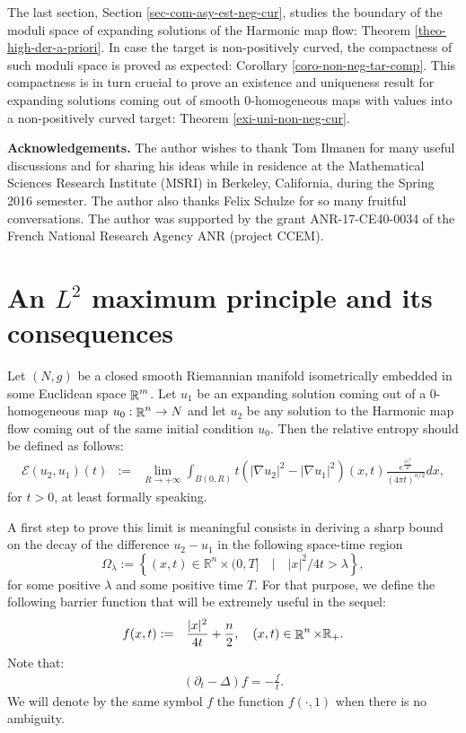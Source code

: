 \documentclass[a4paper,11pt,reqno]{amsart}
\def\R{\mathop{\rm \mathbb{R}}\nolimits}
\begin{document}
The last section, Section \ref{sec-com-asy-est-neg-cur}, studies the boundary of the moduli space of expanding solutions of the Harmonic map flow: Theorem \ref{theo-high-der-a-priori}. In case the target is non-positively curved, the compactness of such moduli space is proved as expected: Corollary \ref{coro-non-neg-tar-comp}. This compactness is in turn crucial to prove an existence and uniqueness result for expanding solutions coming out of smooth $0$-homogeneous maps with values into a non-positively curved target: Theorem \ref{exi-uni-non-neg-cur}. 

\textbf{Acknowledgements.}
The author wishes to thank Tom Ilmanen for many useful discussions and for sharing his ideas while in residence at the Mathematical Sciences Research Institute (MSRI) in Berkeley, California, during the Spring 2016 semester. The author also thanks Felix Schulze for so many fruitful conversations. The author was supported by the grant ANR-17-CE40-0034 of the French National Research Agency ANR (project CCEM).


\section{An $L^2$ maximum principle and its consequences}\label{section-L^2-max-ppe}

Let $(N,g)$ be a closed smooth Riemannian manifold isometrically embedded in some Euclidean space $\R^m$. Let $u_1$ be an expanding solution coming out of a $0$-homogeneous map $u_0:\R^n\rightarrow N$  and let $u_2$ be any solution to the Harmonic map flow coming out of the same initial condition $u_0$. Then the relative entropy should be defined as follows:
\begin{eqnarray}\label{def-rel-entropy}
\mathcal{E}(u_2,u_1)(t)&:=&\lim_{R\rightarrow+\infty}\int_{B(0,R)}t(|\nabla u_2|^2-|\nabla u_1|^2)(x,t)\frac{e^{\frac{|x|^2}{4t}}}{(4\pi t)^{n/2}}dx,%
\end{eqnarray}
for $t>0$,
at least formally speaking.

A first step to prove this limit is meaningful consists in deriving a sharp bound on the decay of the difference $u_2-u_1$ in the following space-time region $$\Omega_{\lambda}:=\left\{(x,t)\in \mathbb{R}^n\times (0,T]\quad|\quad |x|^2/{4t}>\lambda\right\},$$ for some positive $\lambda$ and some positive time $T$. For that purpose, we define the following barrier function that will be extremely useful in the sequel:
\begin{eqnarray*}
f(x,t)&:=&\frac{|x|^2}{4t}+\frac{n}{2},\quad (x,t) \in\R^n\times\mathbb{R}_+.
\end{eqnarray*}
Note that:
\begin{eqnarray*}
(\partial_t-\Delta)f=-\frac{f}{t}.
\end{eqnarray*}
We will denote by the same symbol $f$ the function $f(\cdot,1)$ when there is no ambiguity.
\end{document}
